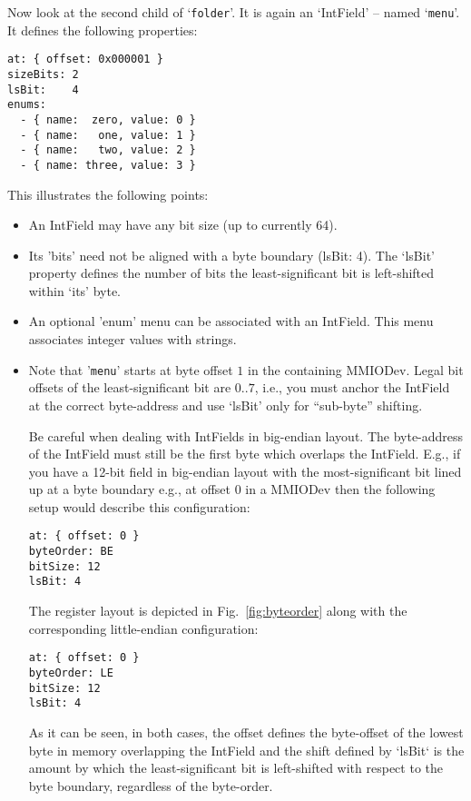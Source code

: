 \documentclass[10pt]{article}
\newcommand{\cod}[1] {{\tt#1}}
\newcommand{\figr}[1]{Fig.~\ref{fig:#1}}
\begin{document}
Now look at the second child of `\cod{folder}'. It is again an `IntField' -- named
`\cod{menu}'.  It defines the following properties:
\begin{verbatim}
at: { offset: 0x000001 }
sizeBits: 2
lsBit:    4
enums:
  - { name:  zero, value: 0 }
  - { name:   one, value: 1 }
  - { name:   two, value: 2 }
  - { name: three, value: 3 }
\end{verbatim}
This illustrates the following points:
\begin{itemize}
\item An IntField may have any bit size (up to currently 64).
\item Its 'bits' need not be aligned with a byte boundary (lsBit: 4). The
      `lsBit' property defines the number of bits the least-significant bit
      is left-shifted within `its' byte.
\item An optional 'enum' menu can be associated with an IntField. This
      menu associates integer values with strings.
\item Note that '\cod{menu}' starts at byte offset $1$ in the containing MMIODev.
      Legal bit offsets of the least-significant bit are $0..7$, i.e., you
      must anchor the IntField at the correct byte-address and use `lsBit'
      only for ``sub-byte'' shifting.

      Be careful when dealing with IntFields in big-endian layout. The byte-address
      of the IntField must still be the first byte which overlaps the IntField. E.g.,
      if you have a 12-bit field in big-endian layout with the most-significant
      bit lined up at a byte boundary e.g., at offset $0$ in a MMIODev then the
      following setup would describe this configuration:
\begin{verbatim}
at: { offset: 0 }
byteOrder: BE
bitSize: 12
lsBit: 4
\end{verbatim}
      The register layout is depicted in \figr{byteorder} along with the corresponding
      little-endian configuration:
\begin{verbatim}
at: { offset: 0 }
byteOrder: LE
bitSize: 12
lsBit: 4
\end{verbatim}
	  As it can be seen, in both cases, the offset defines the byte-offset of the
      lowest byte in memory overlapping the IntField and the shift defined by `lsBit` 
      is the amount by which the least-significant bit is left-shifted with respect
      to the byte boundary, regardless of the byte-order.
\end{itemize}
\end{document}
